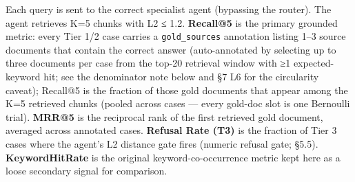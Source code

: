 \documentclass[
  american,
  a4paper,
]{article}
\begin{document}
Each query is sent to the correct specialist agent (bypassing the
router). The agent retrieves K=5 chunks with L2 ≤ 1.2. \textbf{Recall@5}
is the primary grounded metric: every Tier 1/2 case carries a
\texttt{gold\_sources} annotation listing 1--3 source documents that
contain the correct answer (auto-annotated by selecting up to three
documents per case from the top-20 retrieval window with ≥1
expected-keyword hit; see the denominator note below and §7 L6 for the
circularity caveat); Recall@5 is the fraction of those gold documents
that appear among the K=5 retrieved chunks (pooled across cases ---
every gold-doc slot is one Bernoulli trial). \textbf{MRR@5} is the
reciprocal rank of the first retrieved gold document, averaged across
annotated cases. \textbf{Refusal Rate (T3)} is the fraction of Tier 3
cases where the agent's L2 distance gate fires (numeric refusal gate;
§5.5). \textbf{KeywordHitRate} is the original keyword-co-occurrence
metric kept here as a loose secondary signal for comparison.
\end{document}
